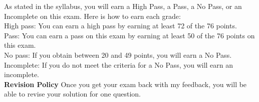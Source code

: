 \documentclass[11pt,addpoints,letterpaper]{exam}
\begin{document}
As stated in the syllabus, you will earn a High Pass, a Pass, a No Pass, or an Incomplete on this exam. Here is how to earn each grade:
\\[1em]
High pass: You can earn a high pass by earning at least 72 of the 76 points. \\[5pt]
Pass: You can earn a pass on this exam by earning at least 50 of the 76 points on this exam. \\[5pt]
No pass: If you obtain between 20 and 49 points, you will earn a No Pass.\\[5pt]
Incomplete: If you do not meet the criteria for a No Pass, you will earn an incomplete. 
\\[3em]
{\bf Revision Policy} Once you get your exam back with my feedback, you will be able to revise your solution for one question. 

\end{document}
